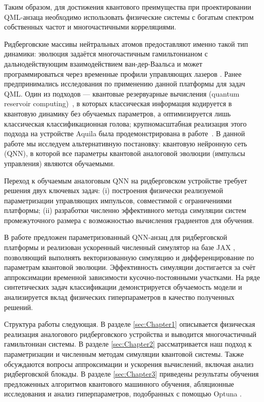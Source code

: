 Таким образом, для достижения квантового преимущества при проектировании QML-анзаца необходимо использовать физические системы
с богатым спектром собственных частот и многочастичными корреляциями.

Ридберговские массивы нейтральных атомов предоставляют именно такой тип динамики: эволюция задаётся многочастичным гамильтонианом с
дальнодействующим взаимодействием ван-дер-Ваальса и может программироваться через временные профили управляющих лазеров
\cite{saffman2010quantum,wurtz2023aquila,ebadi2022mis}.
Ранее предпринимались исследования по применению данной платформы для задач QML. Один из подходов --- квантовые резервуарные
вычисления (quantum reservoir computing)~\cite{fujii2017qrc}, в которых классическая информация кодируется в квантовую
динамику без обучаемых параметров, а оптимизируется лишь классическая классификационная голова; крупномасштабная реализация
этого подхода на устройстве Aquila была продемонстрирована в работе~\cite{kornjaca2024qrc}. В данной работе мы исследуем альтернативную постановку: квантовую нейронную
сеть (QNN), в которой все параметры квантовой аналоговой эволюции (импульсы управления) являются обучаемыми.

Переход к обучаемым аналоговым QNN на ридберговском устройстве требует решения двух ключевых задач:
(i) построения физически реализуемой параметризации управляющих импульсов, совместимой с ограничениями платформы;
(ii) разработки численно эффективного метода симуляции систем промежуточного размера с возможностью вычисления градиентов для обучения.

В работе предложен параметризованный QNN-анзац для ридберговской платформы и реализован ускоренный численный симулятор на базе JAX
\cite{bradbury2018jax}, позволяющий выполнять векторизованную симуляцию и дифференцирование по параметрам квантовой эволюции.
Эффективность симуляции достигается за счёт аппроксимации временной зависимости кусочно-постоянными участками. На ряде синтетических задач
классификации демонстрируется обучаемость модели и анализируется вклад физических гиперпараметров в качество полученных решений.

Структура работы следующая. В разделе \ref{sec:Chapter1} описывается физическая реализация аналогового ридберговского устройства и выводится многочастичный
гамильтониан системы.
В разделе \ref{sec:Chapter2} рассматривается наш подход к параметризации и численным методам симуляции квантовой системы. Также обсуждаются вопросы 
аппроксимации и ускорения вычислений, включая анализ ридберговской блокады.
В разделе \ref{sec:Chapter3} приведены результаты обучения предложенных алгоритмов квантового машинного обучения, абляционные исследования и анализ
гиперпараметров, подобранных с помощью Optuna \cite{akiba2019optuna}.
